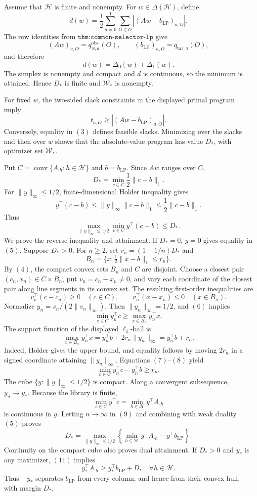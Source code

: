Assume that \(\mathcal H\) is finite and nonempty. For \(w\in\Delta(\mathcal H)\), define
\[
d(w)=\frac12\sum_{a=0}^1\sum_{O\in\mathcal O}|(Aw-b_{\mathrm{LP}})_{a,O}|.\tag{1}
\]
The row identities from \(\texttt{thm:common-selector-lp}\) give
\[
(Aw)_{a,O}=q^{\mathrm{obs}}_{w,a}(O),\qquad (b_{\mathrm{LP}})_{a,O}=q_{\mathrm{tar},a}(O),
\]
and therefore
\[
d(w)=\Delta_0(w)+\Delta_1(w).\tag{2}
\]
The simplex is nonempty and compact and \(d\) is continuous, so the minimum is attained. Hence \(D_*\) is finite and \(\mathcal W_*\) is nonempty.

For fixed \(w\), the two-sided slack constraints in the displayed primal program imply
\[
t_{a,O}\ge |(Aw-b_{\mathrm{LP}})_{a,O}|.\tag{3}
\]
Conversely, equality in \((3)\) defines feasible slacks. Minimizing over the slacks and then over \(w\) shows that the absolute-value program has value \(D_*\), with optimizer set \(\mathcal W_*\).

Put \(C=\operatorname{conv}\{A_{\cdot h}:h\in\mathcal H\}\) and \(b=b_{\mathrm{LP}}\). Since \(Aw\) ranges over \(C\),
\[
D_*=\min_{c\in C}\frac12\lVert c-b\rVert_1.\tag{4}
\]
For \(\lVert y\rVert_\infty\le1/2\), finite-dimensional Holder inequality gives
\[
y^\top(c-b)\le\lVert y\rVert_\infty\lVert c-b\rVert_1\le\frac12\lVert c-b\rVert_1.
\]
Thus
\[
\max_{\lVert y\rVert_\infty\le1/2}\min_{c\in C}y^\top(c-b)\le D_*.\tag{5}
\]
We prove the reverse inequality and attainment. If \(D_*=0\), \(y=0\) gives equality in \((5)\). Suppose \(D_*>0\). For \(n\ge2\), set \(r_n=(1-1/n)D_*\) and
\[
B_n=\{x:\tfrac12\lVert x-b\rVert_1\le r_n\}.
\]
By \((4)\), the compact convex sets \(B_n\) and \(C\) are disjoint. Choose a closest pair \((c_n,x_n)\in C\times B_n\), put \(v_n=c_n-x_n\ne0\), and vary each coordinate of the closest pair along line segments in its convex set. The resulting first-order inequalities are
\[
v_n^\top(c-c_n)\ge0\quad(c\in C),\qquad v_n^\top(x-x_n)\le0\quad(x\in B_n).\tag{6}
\]
Normalize \(y_n=v_n/(2\lVert v_n\rVert_\infty)\). Then \(\lVert y_n\rVert_\infty=1/2\), and \((6)\) implies
\[
\min_{c\in C}y_n^\top c\ge\max_{x\in B_n}y_n^\top x.\tag{7}
\]
The support function of the displayed \(\ell_1\)-ball is
\[
\max_{x\in B_n}y_n^\top x=y_n^\top b+2r_n\lVert y_n\rVert_\infty=y_n^\top b+r_n.\tag{8}
\]
Indeed, Holder gives the upper bound, and equality follows by moving \(2r_n\) in a signed coordinate attaining \(\lVert y_n\rVert_\infty\). Equations \((7)\)--\((8)\) yield
\[
\min_{c\in C}y_n^\top c-y_n^\top b\ge r_n.\tag{9}
\]
The cube \(\{y:\lVert y\rVert_\infty\le1/2\}\) is compact. Along a convergent subsequence, \(y_n\to y_*\). Because the library is finite,
\[
\min_{c\in C}y^\top c=\min_{h\in\mathcal H}y^\top A_{\cdot h}\tag{10}
\]
is continuous in \(y\). Letting \(n\to\infty\) in \((9)\) and combining with weak duality \((5)\) proves
\[
D_*=\max_{\lVert y\rVert_\infty\le1/2}\left\{\min_{h\in\mathcal H}y^\top A_{\cdot h}-y^\top b_{\mathrm{LP}}\right\}.\tag{11}
\]
Continuity on the compact cube also proves dual attainment. If \(D_*>0\) and \(y_*\) is any maximizer, \((11)\) implies
\[
y_*^\top A_{\cdot h}\ge y_*^\top b_{\mathrm{LP}}+D_*\quad\forall h\in\mathcal H.
\]
Thus \(-y_*\) separates \(b_{\mathrm{LP}}\) from every column, and hence from their convex hull, with margin \(D_*\).

